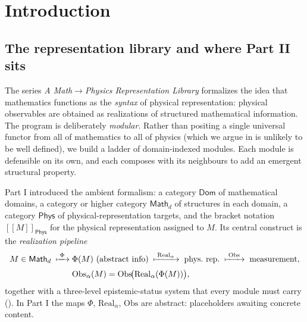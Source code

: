 \documentclass[12pt]{article}
\theoremstyle{definition}
\theoremstyle{remark}
\providecommand{\llbracket}{[\![}
\providecommand{\rrbracket}{]\!]}
\newcommand{\Real}{\mathrm{Real}}
\newcommand{\Obs}{\mathrm{Obs}}
\newcommand{\Dom}{\mathsf{Dom}}
\newcommand{\Math}{\mathsf{Math}}
\newcommand{\Phys}{\mathsf{Phys}}
\begin{document}
\tableofcontents

\section{Introduction}
\label{sec:intro}

\subsection{The representation library and where Part II sits}

The series \emph{A Math$\rightarrow$Physics Representation Library} formalizes the idea that
mathematics functions as the \emph{syntax} of physical representation: physical
observables are obtained as realizations of structured mathematical information. The
program is deliberately \emph{modular}. Rather than positing a single universal functor
from all of mathematics to all of physics (which we argue in 
is unlikely to be well defined), we build a ladder of domain-indexed modules. Each
module is defensible on its own, and each composes with its neighbours to add an
emergent structural property.

Part I introduced the ambient formalism: a category $\Dom$ of mathematical domains,
a category or higher category $\Math_d$ of structures in each domain, a category $\Phys$
of physical-representation targets, and the bracket notation $\llbracket M\rrbracket_{\Phys}$
for the physical representation assigned to $M$. Its central construct is the
\emph{realization pipeline}
\begin{equation}
\label{eq:pipeline}
\begin{aligned}
M \in \Math_d \;\xmapsto{\;\Phi\;}\;& \Phi(M)\ \text{(abstract info)}
\;\xmapsto{\;\Real_\alpha\;}\; \text{phys.\ rep.}
\;\xmapsto{\;\Obs\;}\; \text{measurement},\\[2pt]
& \Obs_\alpha(M) = \Obs\!\big(\Real_\alpha(\Phi(M))\big),
\end{aligned}
\end{equation}
together with a three-level epistemic-status system that every module must carry
(). In Part I the maps $\Phi$, $\Real_\alpha$, $\Obs$ are abstract:
placeholders awaiting concrete content.
\end{document}
